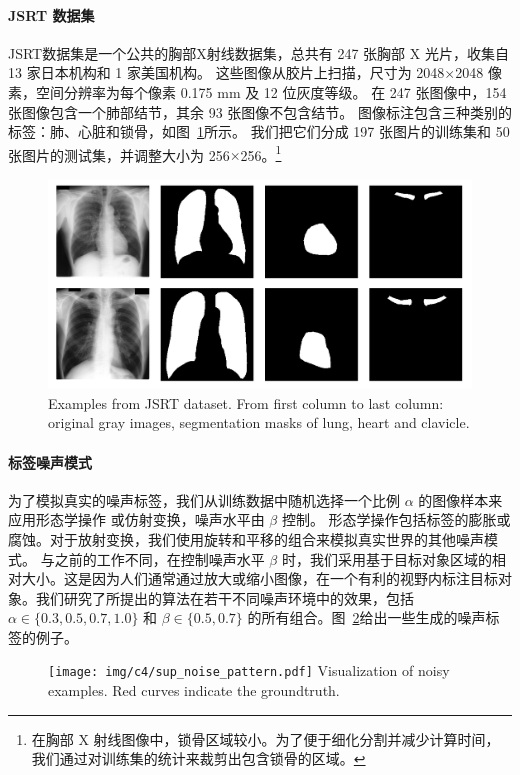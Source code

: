 \paragraph{JSRT 数据集}
JSRT数据集\citep{Shiraishi2000DevelopmentOA,Ginneken2006SegmentationOA}是一个公共的胸部X射线数据集，总共有 247 张胸部 X 光片，收集自 13 家日本机构和 1 家美国机构。
这些图像从胶片上扫描，尺寸为 2048$\times$2048 像素，空间分辨率为每个像素 0.175 mm 及 12 位灰度等级。
在 247 张图像中，154 张图像包含一个肺部结节，其余 93 张图像不包含结节。
图像标注包含三种类别的标签：肺、心脏和锁骨，如图~\ref{fig:jsrt_intro}所示。
我们把它们分成 197 张图片的训练集和 50 张图片的测试集，并调整大小为 256$\times$256。\footnote{在胸部 X 射线图像中，锁骨区域较小。为了便于细化分割并减少计算时间，我们通过对训练集的统计来裁剪出包含锁骨的区域。}
    \begin{figure}[tbp]
        \centering 
        \includegraphics[width=1.0\textwidth]{img/c4/c_jsrt.png}
        {Examples from JSRT dataset. From first column to last column: original gray images, segmentation masks of lung, heart and clavicle.}
        \label{fig:jsrt_intro}
    \end{figure}

\paragraph{标签噪声模式}
为了模拟真实的噪声标签，我们从训练数据中随机选择一个比例 $\alpha$ 的图像样本来应用形态学操作\citep{Zhu2019PickandLearnAQ, Zhang2020CharacterizingLE,Zhang2020RobustMI,Xue2020CascadedRL} 或仿射变换，噪声水平由 $\beta$ 控制。
形态学操作包括标签的膨胀或腐蚀。对于放射变换，我们使用旋转和平移的组合来模拟真实世界的其他噪声模式。
与之前的工作不同，在控制噪声水平 $\beta$ 时，我们采用基于目标对象区域的相对大小。这是因为人们通常通过放大或缩小图像，在一个有利的视野内标注目标对象。我们研究了所提出的算法在若干不同噪声环境中的效果，包括 $\alpha \in \{ 0.3, 0.5, 0.7, 1.0 \}$ 和 $\beta \in \{0.5, 0.7\}$ 的所有组合。图~\ref{fig:noise_pattern}给出一些生成的噪声标签的例子。
\begin{figure}[tbp]
	\centering 
	\texttt{[image: img/c4/sup\_noise\_pattern.pdf]}
    {Visualization of noisy examples. Red curves indicate the groundtruth.}
	\label{fig:noise_pattern}
\end{figure}


